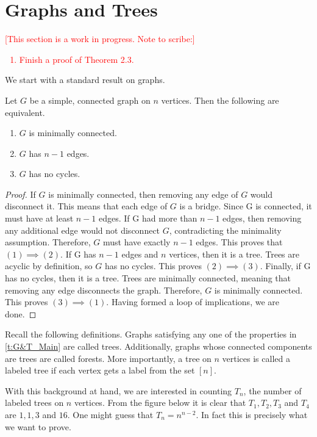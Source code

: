 \section{Graphs and Trees}
\textcolor{red}{[This section is a work in progress. Note to scribe:]
\begin{enumerate}
    \item Finish a proof of Theorem 2.3.
\end{enumerate}
}
We start with a standard result on graphs.
\begin{theorem}
    Let $G$ be a simple, connected graph on $n$ vertices. Then the following are equivalent.
    \begin{enumerate}
        \item $G$ is minimally connected.
        \item $G$ has $n-1$ edges.
        \item $G$ has no cycles.
    \end{enumerate}
    \label{t:G&T_Main}
\end{theorem}
\begin{proof}
If $G$ is minimally connected, then removing any edge of $G$ would disconnect it. This means that each edge of $G$ is a bridge. Since G is connected, it must have at least $n-1$ edges. If G had more than $n-1$ edges, then removing any additional edge would not disconnect $G$, contradicting the minimality assumption. Therefore, $G$ must have exactly $n-1$ edges. This proves that $(1)\implies (2)$. If G has $n-1$ edges and $n$ vertices, then it is a tree. Trees are acyclic by definition, so $G$ has no cycles. This proves $(2)\implies (3)$. Finally, if G has no cycles, then it is a tree. Trees are minimally connected, meaning that removing any edge disconnects the graph. Therefore, $G$ is minimally connected. This proves $(3)\implies (1)$. Having formed a loop of implications, we are done.
\end{proof}
Recall the following definitions. Graphs satisfying any one of the properties in \cref{t:G&T_Main} are called trees. Additionally, graphs whose connected components are trees are called forests. More importantly, a tree on $n$ vertices is called a labeled tree if each vertex gets a label from the set $[n]$. 
\par
With this background at hand, we are interested in counting $T_n$, the number of labeled trees on $n$ vertices. From the figure below it is clear that $T_1,T_2,T_3$ and $T_4$ are $1,1,3$ and $16$. One might guess that $T_n=n^{n-2}$. In fact this is precisely what we want to prove.
